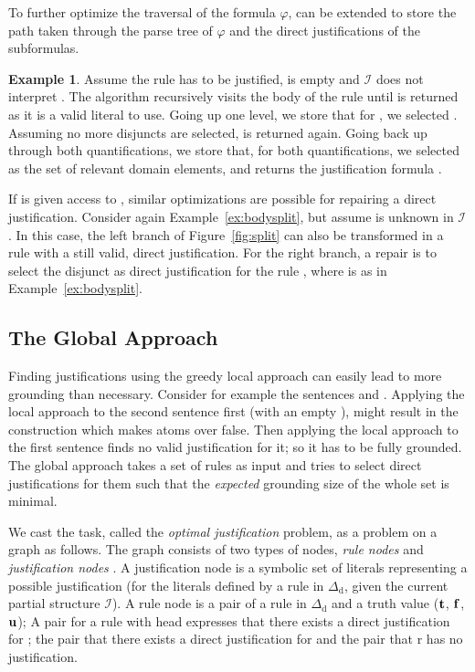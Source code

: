 \documentclass[11pt]{article}
\newcommand{\m}[1]{\ensuremath{#1}\xspace}
\newcommand{\trval}[1]{\m{{\bf #1}}}
\newcommand{\ltrue}{\trval{t}}
\newcommand{\lfalse}{\trval{f}}
\newcommand{\lunkn}{\trval{u}}
\newcommand{\I}{\m{\mathcal{I}}}
\newcommand{\D}{\m{\Delta}}
\newcommand{\f}{\m{\varphi}}
\theoremstyle{plain}
\theoremstyle{definition}
\theoremstyle{example_basic}
\newtheorem{example}[thm]{Example}
\theoremstyle{example_contd}
\theoremstyle{plain}
\newcommand{\Dd}{\ensuremath{\D_\text{d}}\xspace}
\newcommand{\change}[1]{#1}
\begin{document}
\change{To further optimize the traversal of the formula \f,
\buildconstr can be extended to store the path taken through the parse
tree of \f and the direct justifications of the subformulas.}

\begin{example}
Assume the rule  has to be justified, \jgraph is empty and \I does not
interpret . The  \buildconstr algorithm recursively visits the body of the rule
until  is returned as it is a valid
literal to use. Going up one level, we store that for , we selected . Assuming no more disjuncts
are selected,  is returned again. Going back up through
both quantifications, we store that, for both quantifications, we selected
 as the set of relevant domain elements, and \buildconstr returns the
justification formula 
.
\end{example}

If \buildconstr is given access to , similar optimizations are possible for repairing a direct justification. Consider again Example~\ref{ex:bodysplit}, but assume   is unknown in \I. In this case, the left branch of Figure~\ref{fig:split} can also be transformed in a rule with a still valid, direct justification. For the right branch, a repair is to select the disjunct  as direct justification for the rule
, where  is as in Example~\ref{ex:bodysplit}.


\subsection{The Global Approach}\label{ssec:global}
Finding justifications using the greedy local approach can easily lead to more grounding than necessary. Consider for example the sentences  and . Applying the local approach to the second sentence first (with an empty \jgraph), might result in the construction which makes atoms over  false. 
Then applying the local approach to the first sentence finds no
valid justification for it; so it has to be fully grounded.
The global approach takes a set of rules as input and tries to select direct justifications for them such that the \emph{expected} grounding size of the whole set is minimal.

\change{We cast the task, called the \emph{optimal justification}
  problem, as a problem on a graph as follows. The graph consists of
  two types of nodes, \emph{rule nodes}  and \emph{justification
    nodes} . A justification node is a symbolic set of literals
  representing a possible justification (for the literals defined by a
  rule in \Dd, given the current partial structure \I). A rule node
  is a pair  of a rule  in \Dd and a truth value 
  (\ltrue, \lfalse, \lunkn); A pair  for a rule 
  with head  expresses that there exists a direct justification for
  ; the pair  that there exists a direct
  justification for  and the pair  that
  r has no justification.}
\end{document}
